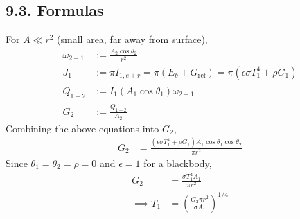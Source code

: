 \begin{multicols*}{2}
\subsection*{9.3. Formulas}
For $A \ll r^2$ (small area, far away from surface),
\begin{align*}
    \omega_{2-1} &:= \frac{A_2 \cos\theta_2}{r^2}\\
    J_1 &:= \pi I_{1, e+r} = \pi(E_b + G_{\text{ref}}) = \pi(\epsilon\sigma T_{1}^4  + \rho G_{1}) \\ 
    \dot{Q}_{1-2} &:= I_1 (A_1 \cos\theta_1) \omega_{2-1} \\
    G_2 &:= \frac{\dot{Q}_{1-2}}{A_2} 
\end{align*}
Combining the above equations into $G_2$,
\begin{align*}
    G_2 &= \frac{(\epsilon\sigma T_{1}^4  + \rho G_{\text{1}})A_1 \cos\theta_1 \cos\theta_2}{\pi r^2} 
\end{align*}
Since $\theta_1 = \theta_2 = \rho = 0$ and $\epsilon = 1$ for a blackbody,
\begin{align*}
    G_2 &= \frac{\sigma T_{1}^4 A_1}{\pi r^2} \\
    \implies T_{1} &= \left(\frac{G_2 \pi r^2}{\sigma A_1}\right)^{1/4}
\end{align*}

\end{multicols*}


